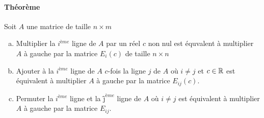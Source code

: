 \paragraph{Théorème} Soit $A$ une matrice de taille $n\times m$
\begin{enumerate}[a)]
  \item Multiplier la $i^{ème}$ ligne de $A$ par un réel $c$ non nul est équvalent à multiplier $A$ à gauche par la matrice $E_i(c)$ de taille $n \times n$
  
  \item Ajouter à la $i^{ème}$ ligne de $A$ $c$-fois la ligne $j$ de $A$ où $i\neq j$ et $c\in \mathbb{R}$ est équivalent à multiplier $A$ à gauche par la matrice $E_{ij}(c)$.
  
  \item Permuter la $i^{ème}$ ligne et la $ĵ^{ème}$ ligne de $A$ où $i\neq j$ est équivalent à multiplier $A$ à gauche par la matrice $E_{ij}$.
\end{enumerate}


